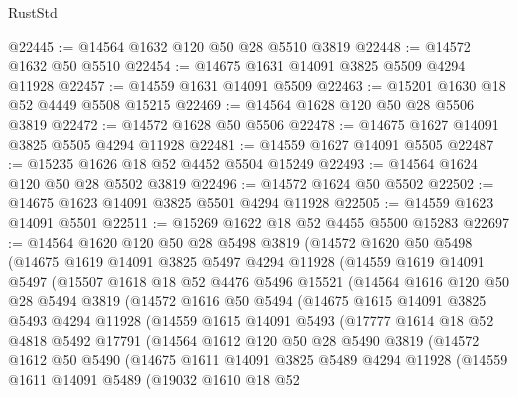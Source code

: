 \begin{lexlean}{RustStd}
\begin{coremodule}
@22445 := @14564 @1632 @120 @50 @28 @5510 @3819
@22448 := @14572 @1632 @50 @5510
@22454 := @14675 @1631 @14091 @3825 @5509 @4294 @11928
@22457 := @14559 @1631 @14091 @5509
@22463 := @15201 @1630 @18 @52 @4449 @5508 @15215
@22469 := @14564 @1628 @120 @50 @28 @5506 @3819
@22472 := @14572 @1628 @50 @5506
@22478 := @14675 @1627 @14091 @3825 @5505 @4294 @11928
@22481 := @14559 @1627 @14091 @5505
@22487 := @15235 @1626 @18 @52 @4452 @5504 @15249
@22493 := @14564 @1624 @120 @50 @28 @5502 @3819
@22496 := @14572 @1624 @50 @5502
@22502 := @14675 @1623 @14091 @3825 @5501 @4294 @11928
@22505 := @14559 @1623 @14091 @5501
@22511 := @15269 @1622 @18 @52 @4455 @5500 @15283
@22697 := @14564
    @1620
    @120
    @50
    @28
    @5498
    @3819
    (@14572
      @1620
      @50
      @5498
      (@14675
        @1619
        @14091
        @3825
        @5497
        @4294
        @11928
        (@14559
          @1619
          @14091
          @5497
          (@15507
            @1618
            @18
            @52
            @4476
            @5496
            @15521
            (@14564
              @1616
              @120
              @50
              @28
              @5494
              @3819
              (@14572
                @1616
                @50
                @5494
                (@14675
                  @1615
                  @14091
                  @3825
                  @5493
                  @4294
                  @11928
                  (@14559
                    @1615
                    @14091
                    @5493
                    (@17777
                      @1614
                      @18
                      @52
                      @4818
                      @5492
                      @17791
                      (@14564
                        @1612
                        @120
                        @50
                        @28
                        @5490
                        @3819
                        (@14572
                          @1612
                          @50
                          @5490
                          (@14675
                            @1611
                            @14091
                            @3825
                            @5489
                            @4294
                            @11928
                            (@14559
                              @1611
                              @14091
                              @5489
                              (@19032
                                @1610
                                @18
                                @52

\end{coremodule}
\end{lexlean}
